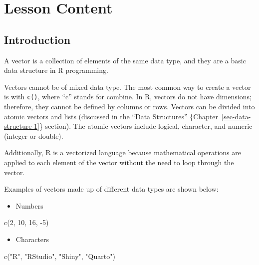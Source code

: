 \documentclass[
  letterpaper,
  DIV=11,
  numbers=noendperiod]{scrreprt}
\newenvironment{Shaded}{}{}
\newcommand{\DecValTok}[1]{\textcolor[rgb]{0.00,0.36,0.77}{#1}}
\newcommand{\FunctionTok}[1]{\textcolor[rgb]{0.44,0.26,0.76}{#1}}
\newcommand{\NormalTok}[1]{\textcolor[rgb]{0.14,0.16,0.18}{#1}}
\newcommand{\SpecialCharTok}[1]{\textcolor[rgb]{0.00,0.36,0.77}{#1}}
\newcommand{\StringTok}[1]{\textcolor[rgb]{0.01,0.18,0.38}{#1}}
\providecommand{\tightlist}{%
  \setlength{\itemsep}{0pt}\setlength{\parskip}{0pt}}\usepackage{longtable,booktabs,array}
\begin{document}
\section{Lesson Content}\label{lesson-content-8}

\subsection{Introduction}\label{introduction-6}

A vector is a collection of elements of the same data type, and they are
a basic data structure in R programming.

Vectors cannot be of mixed data type. The most common way to create a
vector is with \texttt{c()}, where ``c'' stands for combine. In R,
vectors do not have dimensions; therefore, they cannot be defined by
columns or rows. Vectors can be divided into atomic vectors and lists
(discussed in the ``Data Structures''
\{Chapter~\ref{sec-data-structure-1}\} section). The atomic vectors
include logical, character, and numeric (integer or double).

Additionally, R is a vectorized language because mathematical operations
are applied to each element of the vector without the need to loop
through the vector.

Examples of vectors made up of different data types are shown below:

\begin{itemize}
\tightlist
\item
  Numbers
\end{itemize}

\begin{Shaded}
\begin{Highlighting}[]
\FunctionTok{c}\NormalTok{(}\DecValTok{2}\NormalTok{, }\DecValTok{10}\NormalTok{, }\DecValTok{16}\NormalTok{, }\SpecialCharTok{{-}}\DecValTok{5}\NormalTok{)}
\end{Highlighting}
\end{Shaded}

\begin{itemize}
\tightlist
\item
  Characters
\end{itemize}

\begin{Shaded}
\begin{Highlighting}[]
\FunctionTok{c}\NormalTok{(}\StringTok{"R"}\NormalTok{, }\StringTok{"RStudio"}\NormalTok{, }\StringTok{"Shiny"}\NormalTok{, }\StringTok{"Quarto"}\NormalTok{)}
\end{Highlighting}
\end{Shaded}
\end{document}

